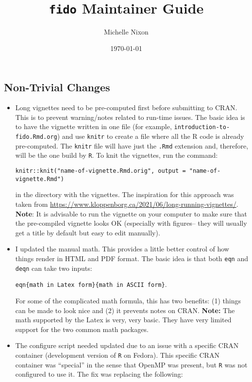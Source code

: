 \documentclass{article}
\title{\texttt{fido} Maintainer Guide}
\author{Michelle Nixon}
\date{\today}
\begin{document}
\maketitle



\subsection*{Non-Trivial Changes}

\begin{itemize}
    \item Long vignettes need to be pre-computed first before submitting to CRAN. This is to prevent warning/notes related to run-time issues. The basic idea is to have the vignette written in one file (for example, \texttt{introduction-to-fido.Rmd.org}) and use \texttt{knitr} to create a file where all the R code is already pre-computed. The \texttt{knitr} file will have just the \texttt{.Rmd} extension and, therefore, will be the one build by \texttt{R}. To knit the vignettes, run the command:
    
    \texttt{knitr::knit("name-of-vignette.Rmd.orig", output = "name-of-vignette.Rmd")}

    in the directory with the vignettes. The inspiration for this approach was taken from \url{https://www.kloppenborg.ca/2021/06/long-running-vignettes/}. \textbf{Note}: It is advisable to run the vignette on your computer to make sure that the pre-compiled vignette looks OK (especially with figures-- they will usually get a title by default but easy to edit manually).
    \item I updated the manual math. This provides a little better control of how things render in HTML and PDF format. The basic idea is that both \texttt{eqn} and \texttt{deqn} can take two inputs:

    \texttt{eqn\{math in Latex form\}\{math in ASCII form\}}.

    For some of the complicated math formula, this has two benefits: (1) things can be made to look nice and (2) it prevents notes on CRAN. \textbf{Note:} The math supported by the Latex is very, very basic. They have very limited support for the two common math packages.
    \item The configure script needed updated due to an issue with a specific CRAN container (development version of \texttt{R} on Fedora). This specific CRAN container was ``special'' in the sense that OpenMP was present, but \texttt{R} was not configured to use it. The fix was replacing the following:


\end{itemize}
\end{document}
